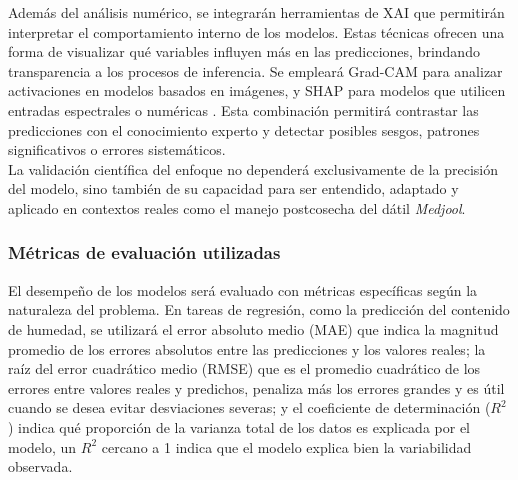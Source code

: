 Además del análisis numérico, se integrarán herramientas de XAI que permitirán interpretar el comportamiento interno de los modelos. Estas técnicas ofrecen una forma de visualizar qué variables influyen más en las predicciones, brindando transparencia a los procesos de inferencia. Se empleará Grad-CAM para analizar activaciones en modelos basados en imágenes, y SHAP para modelos que utilicen entradas espectrales o numéricas \parencite{lundberg_unified_2017}. Esta combinación permitirá contrastar las predicciones con el conocimiento experto y detectar posibles sesgos, patrones significativos o errores sistemáticos.\\

La validación científica del enfoque no dependerá exclusivamente de la precisión del modelo, sino también de su capacidad para ser entendido, adaptado y aplicado en contextos reales como el manejo postcosecha del dátil \textit{Medjool}.

\subsubsection*{Métricas de evaluación utilizadas}

El desempeño de los modelos será evaluado con métricas específicas según la naturaleza del problema. En tareas de regresión, como la predicción del contenido de humedad, se utilizará el error absoluto medio (MAE) que indica la magnitud promedio de los errores absolutos entre las predicciones y los valores reales; la raíz del error cuadrático medio (RMSE) que es el promedio cuadrático de los errores entre valores reales y predichos, penaliza más los errores grandes y es útil cuando se desea evitar desviaciones severas; y el coeficiente de determinación ($R^2$) indica qué proporción de la varianza total de los datos es explicada por el modelo, un $R^2$ cercano a 1 indica que el modelo explica bien la variabilidad observada.\\

